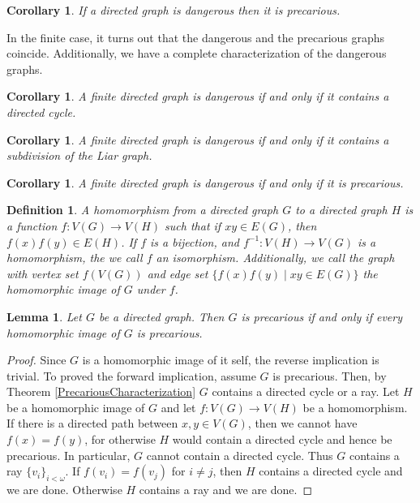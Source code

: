 \documentclass[12pt]{article}
\newtheorem{lem}[thm]{Lemma}
\newtheorem{cor}[thm]{Corollary}
\newtheorem{defn}{Definition}
\theoremstyle{remark}
\begin{document}
\begin{cor}
If a directed graph is dangerous then it is precarious.
\end{cor}

In the finite case, it turns out that the dangerous and the precarious graphs coincide. Additionally, we have a complete characterization of the dangerous graphs.
\begin{cor}\label{FiniteCharacterization}
A finite directed graph is dangerous if and only if it contains a directed cycle.
\end{cor}

\begin{cor}\label{FiniteIsSubdividedLiar}
A finite directed graph is dangerous if and only if it contains a subdivision of the Liar graph.
\end{cor}

\begin{cor}
A finite directed graph is dangerous if and only if it is precarious.
\end{cor}

\begin{defn}
A \emph{homomorphism} from a directed graph $G$ to a directed graph $H$ is a function $f:V(G) \rightarrow V(H)$ such that if $xy \in E(G)$, then $f(x)f(y) \in E(H)$.   If $f$ is a bijection, and $f^{-1}: V(H) \rightarrow V(G)$ is a homomorphism, the we call $f$ an \emph{isomorphism}.  Additionally, we call the graph with vertex set $f(V(G))$ and edge set $\{f(x)f(y) \mid xy \in E(G)\}$ the \emph{homomorphic image} of $G$ under $f$.
\end{defn}

\begin{lem}
Let $G$ be a directed graph.  Then $G$ is precarious if and only if every homomorphic image of $G$ is precarious.
\end{lem}
\begin{proof}
Since $G$ is a homomorphic image of it self, the reverse implication is trivial.  To proved the forward implication, assume $G$ is precarious.  Then, by Theorem \ref{PrecariousCharacterization} $G$ contains a directed cycle or a ray.  Let $H$ be a homomorphic image of $G$ and let $f:V(G) \rightarrow V(H)$ be a homomorphism.  If there is a directed path between $x,y \in V(G)$, then we cannot have $f(x) = f(y)$, for otherwise $H$ would contain a directed cycle and hence be precarious.  In particular, $G$ cannot contain a directed cycle.  Thus $G$ contains a ray $\{v_i\}_{i < \omega}$.  If $f(v_i) = f(v_j)$ for $i \neq j$, then $H$ contains a directed cycle and we are done.  Otherwise $H$ contains a ray and we are done.
\end{proof}
\end{document}
